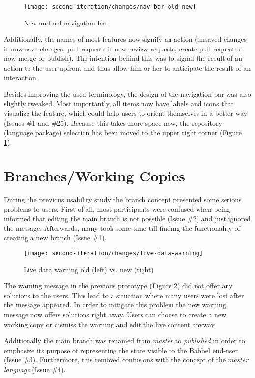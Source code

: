 \begin{figure}[h!]
 \centering
 \texttt{[image: second-iteration/changes/nav-bar-old-new]}
 \caption{New and old navigation bar}
 \label{fig:nav-bar-old-new}
\end{figure}

Additionally, the names of most features now signify an action (unsaved changes is now save changes, pull requests is now review requests, create pull request is now merge or publish). The intention behind this was to signal the result of an action to the user upfront and thus allow him or her to anticipate the result of an interaction.

Besides improving the used terminology, the design of the navigation bar was also slightly tweaked. Most importantly, all items now have labels and icons that visualize the feature, which could help users to orient themselves in a better way (Issues \#1 and \#25). Because this takes more space now, the repository (language package) selection has been moved to the upper right corner (Figure \ref{fig:nav-bar-old-new}).



\section{Branches/Working Copies}
During the previous usability study the branch concept presented some serious problems to users. First of all, most participants were confused when being informed that editing the main branch is not possible (Issue \#2) and just ignored the message. Afterwards, many took some time till finding the functionality of creating a new branch (Issue \#1).

\begin{figure}[h!]
 \centering
 \texttt{[image: second-iteration/changes/live-data-warning]}
 \caption{Live data warning old (left) vs. new (right)}
 \label{fig:live-data-warning}
\end{figure}

The warning message in the previous prototype (Figure \ref{fig:live-data-warning}) did not offer any solutions to the users. This lead to a situation where many users were lost after the message appeared. In order to mitigate this problem the new warning message now offers solutions right away. Users can choose to create a new working copy or dismiss the warning and edit the live content anyway.

Additionally the main branch was renamed from \emph{master} to \emph{published} in order to emphasize its purpose of representing the state visible to the Babbel end-user (Issue \#3). Furthermore, this removed confusions with the concept of the \emph{master language} (Issue \#4).

